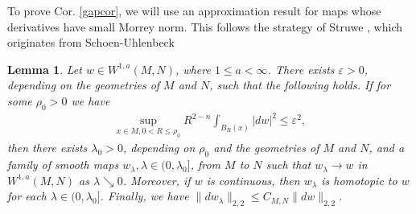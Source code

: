 \documentclass[12pt]{amsart}
\renewcommand{\1}{{\mathbf 1}}
\newtheorem{lemma}[thm]{Lemma}
\theoremstyle{others}
\numberwithin{equation}{section}
\begin{document}
To prove Cor. \ref{gapcor}, we will use an approximation result for maps whose derivatives have small Morrey norm. This follows the strategy of Struwe \cite[Prop. 7.2]{struwehigherdimhmf}, which originates from Schoen-Uhlenbeck \cite[Proposition on pg. 267]{schoenuhlenbeckhmbdryreg}
\begin{lemma}\label{Morreyapproximation}
    Let \(w \in W^{1, a}(M, N)\), where \(1 \leq a < \infty\). There exists \(\varepsilon > 0\), depending on the geometries of \(M\) and \(N\), such that the following holds. If for some \(\rho_0 > 0\) we have
    \begin{align}\label{Morreyapproximation:assumption}
        \sup_{x \in M, 0 < R \leq \rho_0} R^{2-n} \int_{B_R(x)} |dw|^2 \leq \varepsilon^2, 
    \end{align} then there exists \(\lambda_0 > 0\), depending on \(\rho_0\) and the geometries of \(M\) and \(N\), and a family of smooth maps \(w_\lambda, \lambda \in (0, \lambda_0]\), from \(M\) to \(N\) such that \(w_\lambda \to w\) in \(W^{1, a}(M, N)\) as \(\lambda \searrow 0\).  Moreover, if \(w\) is continuous, then \(w_\lambda\) is homotopic to \(w\) for each \(\lambda \in (0, \lambda_0]\). Finally, we have \(\|dw_\lambda\|_{2, 2} \leq C_{M, N}\|dw\|_{2, 2}\).
\end{lemma}
\end{document}
